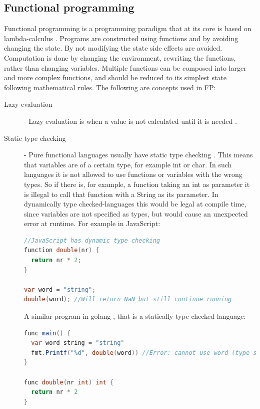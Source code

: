 \documentclass {article}
\begin{document}
\subsection{Functional programming}
Functional programming is a programming paradigm that at its core is based on lambda-calculus \cite{gabmar}. Programs are constructed using functions and by avoiding changing the state. By not modifying the state side effects are avoided. Computation is done by changing the environment, rewriting the functions, rather than changing variables. Multiple functions can be composed into larger and more complex functions, and should be reduced to its simplest state following mathematical rules. The following are concepts used in FP:
\begin{description}
\item [Lazy evaluation] - Lazy evaluation is when a value is not calculated until it is needed \cite{fogus}.
\item [Static type checking] - Pure functional languages usually have static type checking \cite{gabmar}. This means that variables are of a certain type, for example int or char. In such languages it is not allowed to use functions or variables with the wrong types. So if there is, for example, a function taking an int as parameter it is illegal to call that function with a String as its parameter. In dynamically type checked-languages this would be legal at compile time, since variables are not specified as types, but would cause an unexpected error at runtime. For example in JavaScript:

\begin{lstlisting}[language=Java]
//JavaScript has dynamic type checking
function double(nr) {
  return nr * 2;
}

var word = "string";
double(word); //Will return NaN but still continue running
\end{lstlisting}

\item [ ] A similar program in golang \cite{golang}, that is a statically type checked language:

\begin{lstlisting}[language=Java]
func main() {
  var word string = "string"
  fmt.Printf("%d", double(word)) //Error: cannot use word (type string) as type int in argument to double
}

func double(nr int) int {
  return nr * 2
}
\end{lstlisting}


\end{description}
\end{document}
